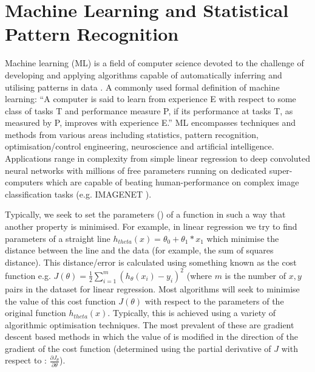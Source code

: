 \section{Machine Learning and Statistical Pattern Recognition}

Machine learning (ML) is a field of computer science 
devoted to the challenge of developing and applying algorithms capable of 
automatically inferring and utilising patterns in data \citep{Murphy2012}.
A commonly used formal definition of machine learning:
``A computer is said to learn from experience E with respect to some class of tasks 
T and performance measure P, if its performance at tasks T, as measured by P, improves 
with experience E.'' \citep{Mitchell1997}
ML encompasses techniques and methods from various areas including statistics,
pattern recognition, optimisation/control engineering, neuroscience and artificial intelligence.
Applications range in complexity from simple linear regression to deep convoluted neural networks 
with millions of free parameters running on dedicated super-computers \citep{Wu2014} 
which are capable of beating human-performance on complex image classification tasks 
(e.g. IMAGENET \citep{Berg2014,He2015}).

Typically, we seek to set the parameters (\theta) of a function in such a way
that another property is minimised.  For example, in linear regression we try to find 
parameters of a straight line \(h_{theta}(x) = \theta_{0} + \theta_{1} * x_{1}\) which minimise the distance
between the line and the data (for example, the sum of squares distance).
This distance/error is calculated using something known as the cost function e.g. \(J(\theta) = \frac{1}{2} \sum^{m}_{i=1} (h_{\theta}(x_{i}) - y_{i})^2\) (where \(m\) is the number of \(x, y\) pairs in the dataset for linear regression.  
Most algorithms will seek to minimise the value of this cost function \(J(\theta)\) with respect to 
the parameters of the original function \(h_{theta}(x)\).  Typically, this is achieved using a variety of algorithmic optimisation techniques.
The most prevalent of these are gradient descent based methods in which the value of \theta is modified 
in the direction of the gradient of the cost function (determined using the partial derivative of \(J\) with respect to \theta: \(\frac{\partial J_{\theta}}{\partial\theta}\)).  


